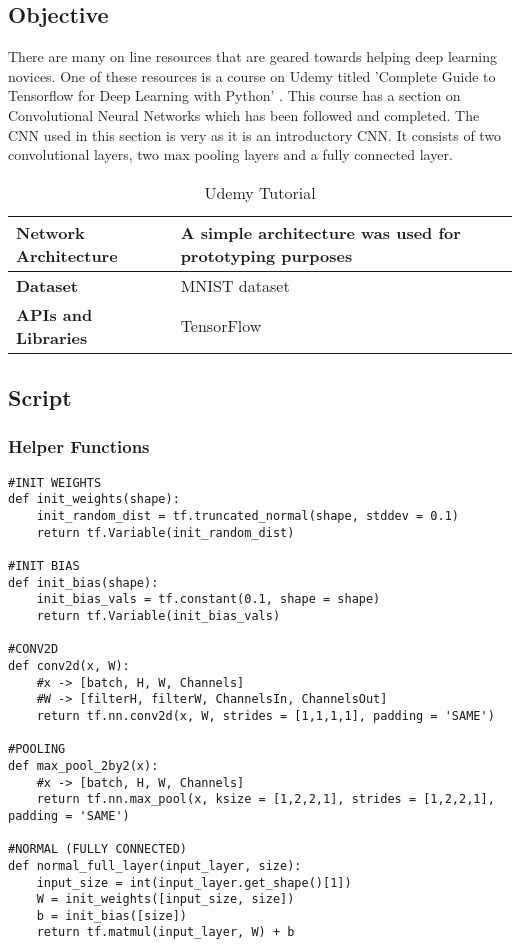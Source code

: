 \subsection*{Objective}
There are many on line resources that are geared towards helping deep learning novices.
One of these resources is a course on Udemy titled 'Complete Guide to Tensorflow for Deep Learning with Python' \parencite{udemy}.
This course has a section on Convolutional Neural Networks which has been followed and completed.
The CNN used in this section is very  as it is an introductory CNN.
It consists of two convolutional layers, two max pooling layers and a fully connected layer.

\begin{table}[h]
\centering
\caption{Udemy Tutorial}
\label{my-label}
\begin{tabular}{|l|p{9cm}|}
\hline
\textbf{Network Architecture} & A simple architecture was used for prototyping purposes            \\ \hline
\textbf{Dataset}              & MNIST dataset \\ \hline
\textbf{APIs and Libraries}   & TensorFlow                                                         \\ \hline
\end{tabular}
\end{table}

\subsection*{Script}
\subsubsection*{Helper Functions}
\begin{lstlisting}[style=Python]
#INIT WEIGHTS
def init_weights(shape):
    init_random_dist = tf.truncated_normal(shape, stddev = 0.1)
    return tf.Variable(init_random_dist)

#INIT BIAS
def init_bias(shape):
    init_bias_vals = tf.constant(0.1, shape = shape)
    return tf.Variable(init_bias_vals)

#CONV2D
def conv2d(x, W):
    #x -> [batch, H, W, Channels]
    #W -> [filterH, filterW, ChannelsIn, ChannelsOut]
    return tf.nn.conv2d(x, W, strides = [1,1,1,1], padding = 'SAME')

#POOLING
def max_pool_2by2(x):
    #x -> [batch, H, W, Channels]
    return tf.nn.max_pool(x, ksize = [1,2,2,1], strides = [1,2,2,1], padding = 'SAME')

#NORMAL (FULLY CONNECTED)
def normal_full_layer(input_layer, size):
    input_size = int(input_layer.get_shape()[1])
    W = init_weights([input_size, size])
    b = init_bias([size])
    return tf.matmul(input_layer, W) + b
\end{lstlisting}


